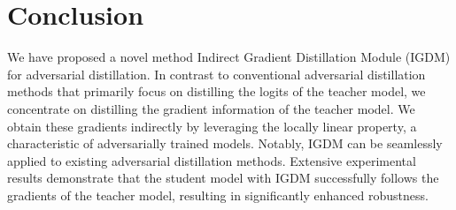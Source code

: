 \documentclass{article} %
\begin{document}








\section{Conclusion}


We have proposed a novel method Indirect Gradient Distillation Module (IGDM) for adversarial distillation.
In contrast to conventional adversarial distillation methods that primarily focus on distilling the logits of the teacher model, we concentrate on distilling the gradient information of the teacher model.
We obtain these gradients indirectly by leveraging the locally linear property, a characteristic of adversarially trained models.
Notably, IGDM can be seamlessly applied to existing adversarial distillation methods.
Extensive experimental results demonstrate that the student model with IGDM successfully follows the gradients of the teacher model, resulting in significantly enhanced robustness.




\end{document}
